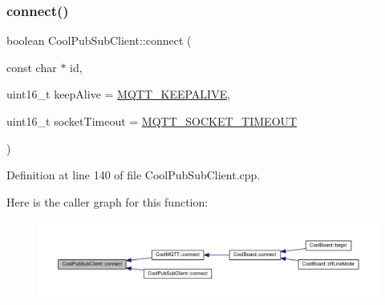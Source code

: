 \subsubsection{\texorpdfstring{connect()}{connect()}\hspace{0.1cm}{\footnotesize\ttfamily [1/4]}}
{\footnotesize\ttfamily boolean Cool\+Pub\+Sub\+Client\+::connect (\begin{DoxyParamCaption}\item[{const char $\ast$}]{id,  }\item[{uint16\+\_\+t}]{keep\+Alive = {\ttfamily \hyperlink{_cool_pub_sub_client_8h_afb4dd8c75385ab30e659314df7c2c335}{M\+Q\+T\+T\+\_\+\+K\+E\+E\+P\+A\+L\+I\+VE}},  }\item[{uint16\+\_\+t}]{socket\+Timeout = {\ttfamily \hyperlink{_cool_pub_sub_client_8h_a092cc564e4d7f03fdab6137e30a7f05b}{M\+Q\+T\+T\+\_\+\+S\+O\+C\+K\+E\+T\+\_\+\+T\+I\+M\+E\+O\+UT}} }\end{DoxyParamCaption})}



Definition at line 140 of file Cool\+Pub\+Sub\+Client.\+cpp.

Here is the caller graph for this function\+:
\nopagebreak
\begin{figure}[H]
\begin{center}
\leavevmode
\includegraphics[width=350pt]{class_cool_pub_sub_client_a2664c2ebc302b2fa49f493a339ecc891_icgraph}
\end{center}
\end{figure}
\mbox{\label{class_cool_pub_sub_client_a7f30e39bf4ca5ea5fb9747c403639a03}} 
